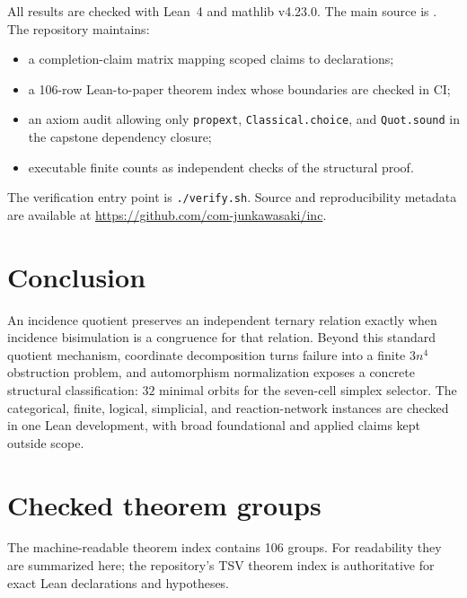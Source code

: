 \documentclass[11pt]{article}
\theoremstyle{definition}
\begin{document}
All results are checked with Lean~4 and mathlib v4.23.0.  The main source is
.  The repository maintains:
\begin{itemize}
\item a completion-claim matrix mapping scoped claims to declarations;
\item a 106-row Lean-to-paper theorem index whose boundaries are checked in CI;
\item an axiom audit allowing only \texttt{propext},
\texttt{Classical.choice}, and \texttt{Quot.sound} in the capstone dependency
closure;
\item executable finite counts as independent checks of the structural proof.
\end{itemize}
The verification entry point is \texttt{./verify.sh}.  Source and reproducibility
metadata are available at \url{https://github.com/com-junkawasaki/inc}.

\section{Conclusion}

An incidence quotient preserves an independent ternary relation exactly when
incidence bisimulation is a congruence for that relation.  Beyond this standard
quotient mechanism, coordinate decomposition turns failure into a finite
$3n^4$ obstruction problem, and automorphism normalization exposes a concrete
structural classification: $32$ minimal orbits for the seven-cell simplex
selector.  The categorical, finite, logical, simplicial, and reaction-network
instances are checked in one Lean development, with broad foundational and
applied claims kept outside scope.

\appendix
\section{Checked theorem groups}

The machine-readable theorem index contains 106 groups.  For readability they
are summarized here; the repository's TSV theorem index is authoritative for
exact Lean declarations and hypotheses.
\end{document}
